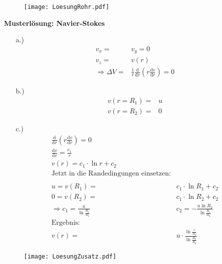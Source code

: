 




\begin{figure}[h]
  \texttt{[image: LoesungRohr.pdf]}
\end{figure}

\textbf{Musterlösung: Navier-Stokes}

\begin{itemize}
  \item[a.)]
    \begin{align*}
      v_x =& v_y = 0\\
      v_z =& v(r)\\
      \Rightarrow \Delta V =& \frac{1}{r}\frac{\text{d}}{\text{d}r}
      \left(r\frac{\text{d}v}{\text{d}r}\right) = 0
    \end{align*}
  \item[b.)]
    \begin{align*}
      v(r = R_1) =& u\\
      v(r = R_2) =& 0
    \end{align*}
  \item[c.)]
    \begin{align*}
      \frac{\text{d}}{\text{d}r}
      \left(r\frac{\text{d}v}{\text{d}r}\right) = 0\\
      \frac{\text{d}v}{\text{d}r} = \frac{c_1}{r}\\
      v(r) = c_1\cdot \ln{r} + c_2\\
      \text{Jetzt in die Randedingungen einsetzen:}\\
      \\
      u = v(R_1) =& c_1 \cdot \ln{R_1} + c_2\\
      0 = v(R_2) =& c_1 \cdot \ln{R_2} + c_2\\
      \Rightarrow c_1 = \frac{u}{\ln{\frac{R_1}{R_2}}} &
      c_2 = -\frac{u\ln{R_2}}{\ln{\frac{R_1}{R_2}}}\\
      \text{Ergebnis:}\\
      v(r) =& u\cdot\frac{\ln{\frac{r}{R_2}}}{\ln{\frac{R_1}{R_2}}}
    \end{align*}
\end{itemize}

\begin{figure}
  \texttt{[image: LoesungZusatz.pdf]}
\end{figure}


